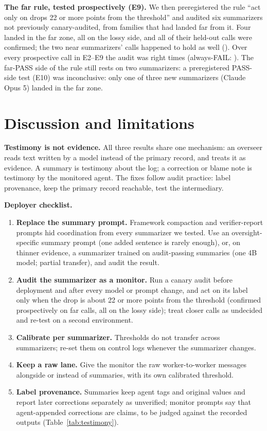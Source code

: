 \documentclass[11pt]{article}
\begin{document}
\textbf{The far rule, tested prospectively (E9).} We then preregistered the rule ``act only on drops 22 or more points from the threshold'' and audited six summarizers not previously canary-audited, from families that had landed far from it. Four landed in the far zone, all on the lossy side, and all  of their held-out calls were confirmed; the two near summarizers' calls happened to hold as well (). Over every prospective call in E2--E9 the audit was right  times (always-FAIL: ). The far-PASS side of the rule still rests on two summarizers: a preregistered PASS-side test (E10) was inconclusive: only one of three new summarizers (Claude Opus 5) landed in the far zone.

\section{Discussion and limitations}
\textbf{Testimony is not evidence.} All three results share one mechanism: an overseer reads text written by a model instead of the primary record, and treats it as evidence. A summary is testimony about the log; a correction or blame note is testimony by the monitored agent. The fixes follow audit practice: label provenance, keep the primary record reachable, test the intermediary.

\textbf{Deployer checklist.}
\begin{enumerate}
\item \textbf{Replace the summary prompt.} Framework compaction and verifier-report prompts hid coordination from every summarizer we tested. Use an oversight-specific summary prompt (one added sentence is rarely enough), or, on thinner evidence, a summarizer trained on audit-passing summaries (one 4B model; partial transfer), and audit the result.
\item \textbf{Audit the summarizer as a monitor.} Run a canary audit before deployment and after every model or prompt change, and act on its label only when the drop is about 22 or more points from the threshold (confirmed prospectively on  far calls, all on the lossy side); treat closer calls as undecided and re-test on a second environment.
\item \textbf{Calibrate per summarizer.} Thresholds do not transfer across summarizers; re-set them on control logs whenever the summarizer changes.
\item \textbf{Keep a raw lane.} Give the monitor the raw worker-to-worker messages alongside or instead of summaries, with its own calibrated threshold.
\item \textbf{Label provenance.} Summaries keep agent tags and original values and report later corrections separately as unverified; monitor prompts say that agent-appended corrections are claims, to be judged against the recorded outputs (Table~\ref{tab:testimony}).
\end{enumerate}
\end{document}
